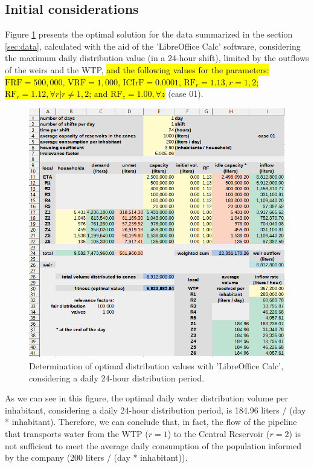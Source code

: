 \documentclass{singlecol}
\theoremstyle{TH}{
\newtheorem{lemma}{Lemma}
\newtheorem{theorem}[lemma]{Theorem}
\newtheorem{corrolary}[lemma]{Corrolary}
\newtheorem{conjecture}[lemma]{Conjecture}
\newtheorem{proposition}[lemma]{Proposition}
\newtheorem{claim}[lemma]{Claim}
\newtheorem{stheorem}[lemma]{Wrong Theorem}
\newtheorem{algorithm}{Algorithm}
}
\theoremstyle{THrm}{
\newtheorem{definition}{Definition}[section]
\newtheorem{question}{Question}[section]
\newtheorem{remark}{Remark}
\newtheorem{scheme}{Scheme}
}
\theoremstyle{THhit}{
\newtheorem{case}{Case}[section]
}
\begin{document}
\subsection{Initial considerations}
\label{sec:initialConsiderations}

Figure \ref{fig:evalOptimalValues} presents the optimal solution for the data summarized in the section \ref{sec:data}, calculated with the aid of the 'LibreOffice Calc' software, considering the maximum daily distribution value (in a 24-hour shift), limited by the outflows of the weirs and the WTP,  \hl{and the following values for the parameters: $\mathrm{FRF}= 500,000$, $\mathrm{VRF}= 1,000$,  $\mathrm{ICIrF} = 0.0001$,  $\mathrm{RF}_r = 1.13, r=1,2$;  $\mathrm{RF}_r = 1.12,  \forall r | r \neq 1,2$; and $\mathrm{RF}_z =1.00, \forall z$} (case 01). 

\begin{figure}[h]
	\begin{center}
	    \caption{Determination of optimal distribution values with 'LibreOffice Calc', considering a daily 24-hour distribution period.}
		\label{fig:evalOptimalValues}
		\centering
		\includegraphics[width=\textwidth]{figures/evalCase01.png}
	\end{center}
\end{figure}

As we can see in this figure, the optimal daily water distribution volume per inhabitant, considering a daily 24-hour distribution period, is 184.96 liters / (day * inhabitant). Therefore, we can conclude that, in fact, the flow of the pipeline that transports water from the WTP ($r=1$) to the Central Reservoir ($r=2$) is not sufficient to meet the average daily consumption of the population informed by the company (200 liters / (day * inhabitant)).
\end{document}
